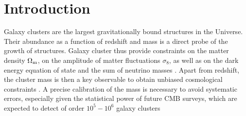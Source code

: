 \documentclass[prd, superscriptaddress, tightenlines, longbibliography, nofootinbib, eqsecnum, amsfonts, amsmath, floatfix, twocolumn, notitlepage]{revtex4-2}
\begin{document}
\section{Introduction}
\setcounter{footnote}{0}

% 

Galaxy clusters are the largest gravitationally bound structures in the Universe. Their abundance as a function of redshift and mass is a direct probe of the growth of structures. Galaxy cluster thus provide constraints on the matter density $\Omega_{\rm m}$, on the amplitude of matter fluctuations $\sigma_8$, as well as on the dark energy equation of state and the sum of neutrino masses \cite{Vikhlinin:2008ym,Sehgal:2010ca,Allen:2011zs,Planck:2013lkt, Mantz:2014xba,Mantz:2014paa, Planck:2015lwi,SPT:2016izt, SPT:2018njh}. Apart from redshift, the cluster mass is then a key observable to obtain unbiased cosmological constraints \cite{Pratt:2019cnf, Salvati:2020exw, Salvati:2021gkt}. A precise calibration of the mass is necessary to avoid systematic errors, especially given the statistical power of future CMB surveys, which are expected to detect of order $10^5 - 10^6$ galaxy clusters \cite{Madhavacheril:2017onh, SimonsObservatory:2018koc, CMB-S4:2016ple}
\end{document}
